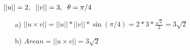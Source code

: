 \subsection{}
\begin{math}
	||u||=2,
	\hspace{6px}
	||v||=3,
	\hspace{6px}
	\theta=\pi/4
\end{math}
\begin{enumerate}
	\item[a)]
		\begin{math}
			||u\times v||
			=||u||*||v||*\sin(\pi/4)
			=2*3*\frac{\sqrt{2}}{2}
			=3\sqrt{2}
		\end{math}
	\item[b)]
		\begin{math}
			Arean
			=||u\times v||
			=3\sqrt{2}
		\end{math}
\end{enumerate}